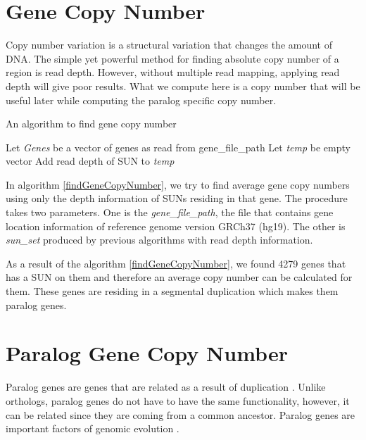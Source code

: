 \section{Gene Copy Number}
Copy number variation is a structural variation that changes the amount of DNA. The simple yet powerful method for finding absolute copy number of a region is read depth. However, without multiple read mapping, applying read depth will give poor results. What we compute here is a copy number that will be useful later while computing the paralog specific copy number.

\begin{algorithm}
\caption{An algorithm to find gene copy number}
\label{findGeneCopyNumber}
\begin{algorithmic}[1]
\State Let \textit{Genes} be a vector of genes as read from gene\_file\_path
\State Let \textit{temp} be empty vector
\State Add read depth of SUN to \textit{temp}
\EndIf
\EndFor
{}
\EndIf
\EndFor
\EndProcedure
\end{algorithmic}
\end{algorithm}

In algorithm \ref{findGeneCopyNumber}, we try to find average gene copy numbers using only the depth information of SUNs residing in that gene. The procedure takes two parameters. One is the \textit{gene\_file\_path}, the file that contains gene location information of reference genome version GRCh37 (hg19). The other is \textit{sun\_set} produced by previous algorithms with read depth information.

As a result of the algorithm \ref{findGeneCopyNumber}, we found 4279 genes that has a SUN on them and therefore an average copy number can be calculated for them. These genes are residing in a segmental duplication which makes them paralog genes.

\section{Paralog Gene Copy Number}
Paralog genes are genes that are related as a result of duplication \cite{Moreira2011}. Unlike orthologs, paralog genes do not have to have the same functionality, however, it can be related since they are coming from a common ancestor. Paralog genes are important factors of genomic evolution \cite{koonin2005orthologs}. 

